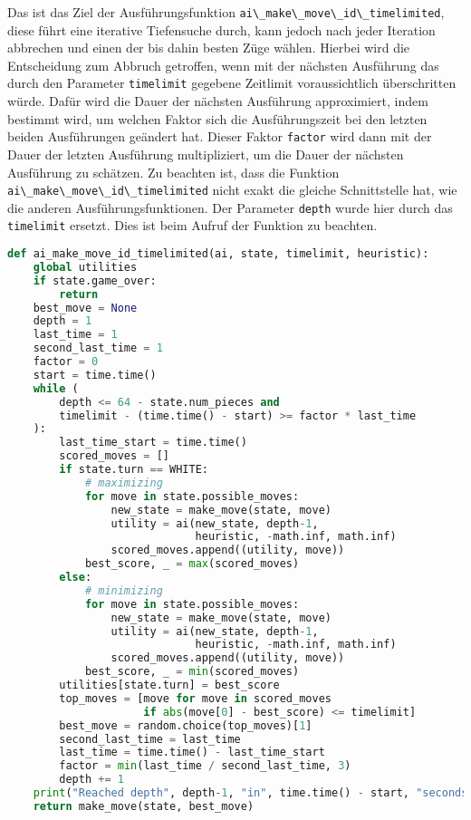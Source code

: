 Das ist das Ziel der Ausführungsfunktion
\passthrough{\lstinline!ai\_make\_move\_id\_timelimited!}, diese führt
eine iterative Tiefensuche durch, kann jedoch nach jeder Iteration
abbrechen und einen der bis dahin besten Züge wählen. Hierbei wird die
Entscheidung zum Abbruch getroffen, wenn mit der nächsten Ausführung das
durch den Parameter \passthrough{\lstinline!timelimit!} gegebene
Zeitlimit voraussichtlich überschritten würde. Dafür wird die Dauer der
nächsten Ausführung approximiert, indem bestimmt wird, um welchen Faktor
sich die Ausführungszeit bei den letzten beiden Ausführungen geändert
hat. Dieser Faktor \passthrough{\lstinline!factor!} wird dann mit der
Dauer der letzten Ausführung multipliziert, um die Dauer der nächsten
Ausführung zu schätzen. Zu beachten ist, dass die Funktion
\passthrough{\lstinline!ai\_make\_move\_id\_timelimited!} nicht exakt
die gleiche Schnittstelle hat, wie die anderen Ausführungsfunktionen.
Der Parameter \passthrough{\lstinline!depth!} wurde hier durch das
\passthrough{\lstinline!timelimit!} ersetzt. Dies ist beim Aufruf der
Funktion zu beachten.

\begin{lstlisting}[language=Python]
def ai_make_move_id_timelimited(ai, state, timelimit, heuristic):
    global utilities
    if state.game_over:
        return
    best_move = None
    depth = 1
    last_time = 1
    second_last_time = 1
    factor = 0
    start = time.time()
    while (
        depth <= 64 - state.num_pieces and
        timelimit - (time.time() - start) >= factor * last_time
    ):
        last_time_start = time.time()
        scored_moves = []
        if state.turn == WHITE:
            # maximizing
            for move in state.possible_moves:
                new_state = make_move(state, move)
                utility = ai(new_state, depth-1,
                             heuristic, -math.inf, math.inf)
                scored_moves.append((utility, move))
            best_score, _ = max(scored_moves)
        else:
            # minimizing
            for move in state.possible_moves:
                new_state = make_move(state, move)
                utility = ai(new_state, depth-1,
                             heuristic, -math.inf, math.inf)
                scored_moves.append((utility, move))
            best_score, _ = min(scored_moves)
        utilities[state.turn] = best_score
        top_moves = [move for move in scored_moves
                     if abs(move[0] - best_score) <= timelimit]
        best_move = random.choice(top_moves)[1]
        second_last_time = last_time
        last_time = time.time() - last_time_start
        factor = min(last_time / second_last_time, 3)
        depth += 1
    print("Reached depth", depth-1, "in", time.time() - start, "seconds")
    return make_move(state, best_move)
\end{lstlisting}
